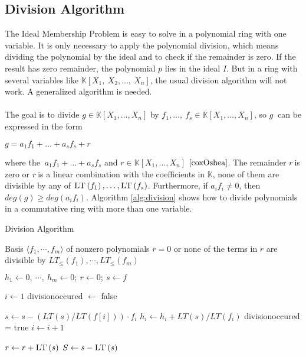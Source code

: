 \newpage


\subsection{Division Algorithm}
\label{subsec:division}

The Ideal Membership Problem is easy to solve in a polynomial ring with one variable. It is only necessary to apply the polynomial division, which means dividing the polynomial by the ideal and to check if the remainder is zero. 
If the result has zero remainder, the polynomial $p$ lies in the ideal $I$.
But in a ring with several variables like $ \mathbb{K} \left[X_{1},~X_{2},\dots,~X_{n}\right]$, the usual division algorithm will not work. A generalized algorithm is needed.\\ \\
The goal is to divide $g \in \mathbb{K}\left[X_{1}, \dots, X_{n}\right] $ by 
$f_{1},\dots,~ f_{s} \in \mathbb{K}\left[X_{1}, \dots, X_{n}\right]$, so $g~$ can be expressed in the form \begin{center}
$g = a_{1}f_{1}+ \ldots + a_{s}f_{s} +r$
\end{center} 
where the $~a_{1}f_{1}+ \ldots + a_{s}f_{s} $ and $r \in \mathbb{K}\left[X_{1}, \dots, X_{n}\right]$ $\cite{coxOshea}$.
The remainder $r~$is zero or $r~$is a linear combination with the coefficients in $\mathbb{K}$, none of them are divisible by any of
$\textsc{LT}\left(f_{1} \right), \ldots, \textsc{LT}\left(f_{s} \right)  $.
Furthermore, if $a_{i}f_{i} \neq 0 $, then
$deg(g) \geq deg(a_{i}f_{i})$. Algorithm \ref{alg:division} shows how to divide polynomials in a commutative ring with more than one variable.

\newpage


\begin{algorithm}
\caption{Division Algorithm \cite{KHZ}}
\label{alg:division}
\begin{algorithmic}[1]

\Require Basis $\langle f_{1}, \cdots, f_{m}\rangle$ of nonzero polynomials  
\Ensure $r=0$ or none of the terms in $r$ are divisible by $ LT_{\leq}\left( f_{1}\right) , \cdots , LT_{\leq} \left( f_{m}\right) $

\State $ h_{1} \gets 0 ,~\cdots ,~h_{m} \gets 0;~r \gets 0;~s \gets f  $

\State $ i \gets 1 $
\State  division\textunderscore occured $ \gets $  false 

\State $ s \gets s - ( LT \left( s\right)/ LT \left( f \left[ i\right] \right))  \cdot f_{i} $
\State $h_{i} \gets h_{i} + LT\left( s\right) / LT\left( f_{i}\right) $
\State division\textunderscore occured = true
\Else
\State $i \gets i+1$
\EndIf
\EndWhile

\State $ r \gets r + \textsc{LT}\left( s\right) $
\State $ S \gets s - \textsc{LT}\left( s\right) $
\EndIf

\EndWhile


\end{algorithmic}
\end{algorithm}


